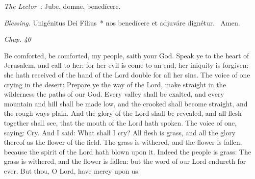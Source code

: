{  {
    \medskip

    \emph{The Lector~:} Jube, domne, benedícere.

    \emph{Blessing.} Unigénitus Dei Fílius~* nos benedícere et adjuváre dignétur. \Rbar{}~Amen.
  }

  {
    \hspace{10ex}{Lesson II.}\hfill\emph{Chap. 40}\hspace{10ex}

    \begin{parcolumns}[rulebetween,colwidths={1=.51\linewidth}]{2}
    {Be comforted, be comforted, my people, saith your God.
      Speak ye to the heart of Jerusalem, and call to her: for her evil is come to an end, her iniquity is forgiven: she hath received of the hand of the Lord double for all her sins.
      The voice of one crying in the desert: Prepare ye the way of the Lord, make straight in the wilderness the paths of our God.
      Every valley shall be exalted, and every mountain and hill shall be made low, and the crooked shall become straight, and the rough ways plain.
      And the glory of the Lord shall be revealed, and all flesh together shall see, that the mouth of the Lord hath spoken.
      The voice of one, saying: Cry. And I said: What shall I cry? All flesh is grass, and all the glory thereof as the flower of the field.
      The grass is withered, and the flower is fallen, because the spirit of the Lord hath blown upon it. Indeed the people is grass:
      The grass is withered, and the flower is fallen: but the word of our Lord endureth for ever.
      But thou, O Lord, have mercy upon us.}
    \end{parcolumns}

}}
